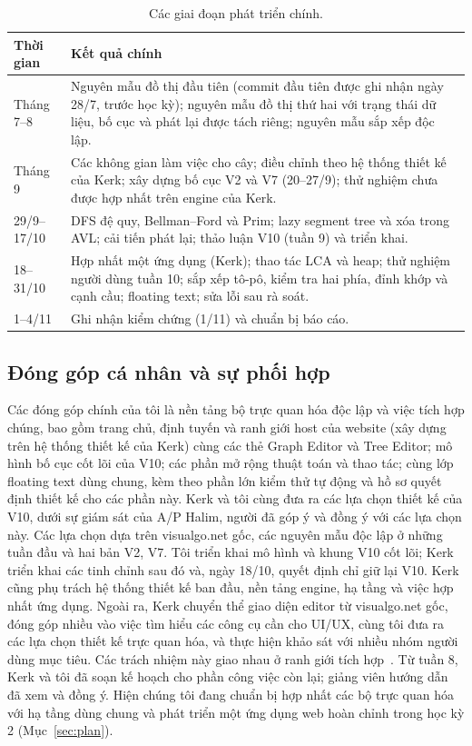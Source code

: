 \documentclass[11pt,a4paper]{article}
\begin{document}
\begin{table}[htbp]\small\centering
\caption{Các giai đoạn phát triển chính.}\label{tab:timeline}
\begin{tabularx}{\linewidth}{@{}p{30mm}Y@{}}\toprule
Thời gian & Kết quả chính\\\midrule
Tháng 7--8 & Nguyên mẫu đồ thị đầu tiên (commit đầu tiên được ghi nhận ngày 28/7, trước học kỳ); nguyên mẫu đồ thị thứ hai với trạng thái dữ liệu, bố cục và phát lại được tách riêng; nguyên mẫu sắp xếp độc lập.\\
Tháng 9 & Các không gian làm việc cho cây; điều chỉnh theo hệ thống thiết kế của Kerk; xây dựng bố cục V2 và V7 (20--27/9); thử nghiệm chưa được hợp nhất trên engine của Kerk.\\
29/9--17/10 & DFS đệ quy, Bellman--Ford và Prim; lazy segment tree và xóa trong AVL; cải tiến phát lại; thảo luận V10 (tuần 9) và triển khai.\\
18--31/10 & Hợp nhất một ứng dụng (Kerk); thao tác LCA và heap; thử nghiệm người dùng tuần 10; sắp xếp tô-pô, kiểm tra hai phía, đỉnh khớp và cạnh cầu; floating text; sửa lỗi sau rà soát.\\
1--4/11 & Ghi nhận kiểm chứng (1/11) và chuẩn bị báo cáo.\\\bottomrule
\end{tabularx}
\end{table}
\FloatBarrier

\subsection{Đóng góp cá nhân và sự phối hợp}
Các đóng góp chính của tôi là nền tảng bộ trực quan hóa độc lập và việc tích hợp chúng, bao gồm trang chủ, định tuyến và ranh giới host của website (xây dựng trên hệ thống thiết kế của Kerk) cùng các thẻ Graph Editor và Tree Editor; mô hình bố cục cốt lõi của V10; các phần mở rộng thuật toán và thao tác; cùng lớp floating text dùng chung, kèm theo phần lớn kiểm thử tự động và hồ sơ quyết định thiết kế cho các phần này. Kerk và tôi cùng đưa ra các lựa chọn thiết kế của V10, dưới sự giám sát của A/P Halim, người đã góp ý và đồng ý với các lựa chọn này. Các lựa chọn dựa trên visualgo.net gốc, các nguyên mẫu độc lập ở những tuần đầu và hai bản V2, V7. Tôi triển khai mô hình và khung V10 cốt lõi; Kerk triển khai các tinh chỉnh sau đó và, ngày 18/10, quyết định chỉ giữ lại V10. Kerk cũng phụ trách hệ thống thiết kế ban đầu, nền tảng engine, hạ tầng và việc hợp nhất ứng dụng. Ngoài ra, Kerk chuyển thể giao diện editor từ visualgo.net gốc, đóng góp nhiều vào việc tìm hiểu các công cụ cần cho UI/UX, cùng tôi đưa ra các lựa chọn thiết kế trực quan hóa, và thực hiện khảo sát với nhiều nhóm người dùng mục tiêu. Các trách nhiệm này giao nhau ở ranh giới tích hợp~\cite{evidence}. Từ tuần 8, Kerk và tôi đã soạn kế hoạch cho phần công việc còn lại; giảng viên hướng dẫn đã xem và đồng ý. Hiện chúng tôi đang chuẩn bị hợp nhất các bộ trực quan hóa với hạ tầng dùng chung và phát triển một ứng dụng web hoàn chỉnh trong học kỳ 2 (Mục~\ref{sec:plan}).
\end{document}
